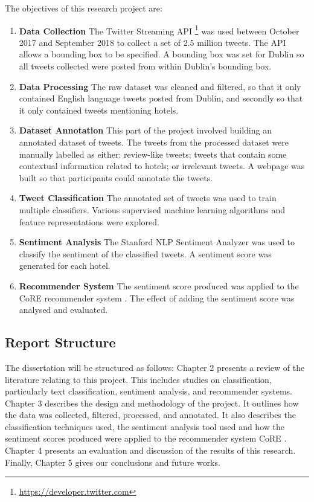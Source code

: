 The objectives of this research project are:
\begin{enumerate}
    \item \textbf{Data Collection}\newline
    The Twitter Streaming API \footnote{\url{https://developer.twitter.com}} was used between October 2017 and September 2018 to collect a set of 2.5 million tweets. The API allows a bounding box to be specified. A bounding box was set for Dublin so all tweets collected were posted from within Dublin's bounding box.
    \item \textbf{Data Processing}\newline
    The raw dataset was cleaned and filtered, so that it only contained English language tweets posted from Dublin, and secondly so that it only contained tweets mentioning hotels.
    \item \textbf{Dataset Annotation} \newline
    This part of the project involved building an annotated dataset of tweets. The tweets from the processed dataset were manually labelled as either: review-like tweets; tweets that contain some contextual information related to hotels; or irrelevant tweets. A webpage was built so that participants could annotate the tweets.
    \item \textbf{Tweet Classification}\newline
    The annotated set of tweets was used to train multiple classifiers. Various supervised machine learning algorithms and feature representations were explored.
    \item \textbf{Sentiment Analysis}\newline
    The Stanford NLP Sentiment Analyzer \cite{stanfordSentiment2013} was used to classify the sentiment of the classified tweets. A sentiment score was generated for each hotel.
    \item \textbf{Recommender System}\newline
    The sentiment score produced was applied to the CoRE recommender system \cite{core2019}. The effect of adding the sentiment score was analysed and evaluated.
\end{enumerate}

\subsection{Report Structure}
The dissertation will be structured as follows: 
Chapter 2 presents a review of the literature relating to this project. This includes studies on classification, particularly text classification, sentiment analysis, and recommender systems. Chapter 3 describes the design and methodology of the project. It outlines how the data was collected, filtered, processed, and annotated. It also describes the classification techniques used, the sentiment analysis tool used and how the sentiment scores produced were applied to the recommender system CoRE \cite{core2019}. Chapter 4 presents an evaluation and discussion of the results of this research. Finally, Chapter 5 gives our conclusions and future works.